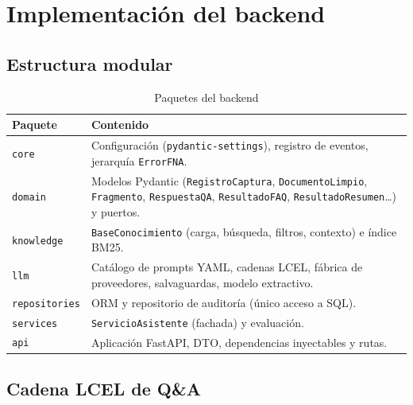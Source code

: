 \chapter{Implementación del backend}\label{cap:backend}

\section{Estructura modular}
\begin{table}[H]\centering\small
\caption{Paquetes del backend}\label{tab:paquetes}
\begin{tabularx}{\linewidth}{@{}l X@{}}\toprule
Paquete & Contenido\\\midrule
\texttt{core} & Configuración (\texttt{pydantic-settings}), registro de eventos, jerarquía \texttt{ErrorFNA}.\\
\texttt{domain} & Modelos Pydantic (\texttt{RegistroCaptura}, \texttt{DocumentoLimpio}, \texttt{Fragmento},
\texttt{RespuestaQA}, \texttt{ResultadoFAQ}, \texttt{ResultadoResumen}\ldots) y puertos.\\
\texttt{knowledge} & \texttt{BaseConocimiento} (carga, búsqueda, filtros, contexto) e índice BM25.\\
\texttt{llm} & Catálogo de prompts YAML, cadenas LCEL, fábrica de proveedores, salvaguardas, modelo extractivo.\\
\texttt{repositories} & ORM y repositorio de auditoría (único acceso a SQL).\\
\texttt{services} & \texttt{ServicioAsistente} (fachada) y evaluación.\\
\texttt{api} & Aplicación FastAPI, DTO, dependencias inyectables y rutas.\\\bottomrule
\end{tabularx}
\end{table}

\section{Cadena LCEL de Q\&A}


